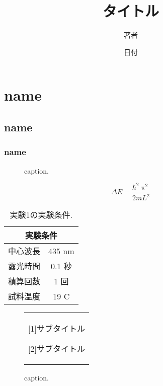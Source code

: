 \documentclass[11pt]{jsarticle}%
\title{タイトル}%
\author{著者}%
\date{日付}%
\begin{document}
\maketitle%
\tableofcontents%
\listoffigures%

\section{name}%

\subsection{name}%

\subsubsection{name}%

\begin{figure}[h]%
 \centering%
 \caption{caption.}%
 \label{label}%
\end{figure}%

\begin{equation}%
 \Delta E=\frac{\mathrm{\hbar}^{2}\uppi^{2}}{2mL^{2}}%
 \label{eq_qw}%
\end{equation}%

\begin{table}[ht]%
 \centering
 \caption{実験1の実験条件.}
 \begin{tabular}{lc}\hline
  \multicolumn{2}{c}{実験条件} \\ \hline
  中心波長 & 435 nm            \\
  露光時間 & 0.1 秒            \\
  積算回数 & 1 回              \\
  試料温度 & 19 C    \\ \hline
 \end{tabular}
 \label{col_1}%
\end{table}%

\begin{figure}[ht]%
 \centering%
 \begin{tabular}{c}%
  \begin{minipage}{0.5\hsize}%
   \centering
   \hspace{1.6cm} [1]サブタイトル%
  \end{minipage}

  \begin{minipage}{0.33\hsize}
   \centering
   \hspace{1.6cm} [2]サブタイトル%
  \end{minipage}
 \end{tabular}%
 \caption{caption.}%
 \label{label}%

\end{figure}
\end{document}
